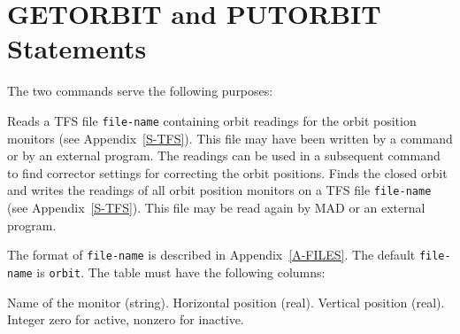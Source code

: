 \section{GETORBIT and PUTORBIT Statements}
\label{S-GETORB}
The two commands
serve the following purposes:
\begin{mylist}
Reads a TFS file {\tt file-name} containing orbit readings for the
orbit position monitors
(see Appendix~\ref{S-TFS}).
This file may have been written by a  command
or by an external program.
The readings can be used in a subsequent  command
to find corrector settings for correcting the orbit positions.
Finds the closed orbit and writes the readings of all orbit
position monitors on a TFS file {\tt file-name}
(see Appendix~\ref{S-TFS}).
This file may be read again by MAD or an external program.
\end{mylist}
The format of {\tt file-name} is described in Appendix~\ref{A-FILES}.
The default {\tt file-name} is {\tt orbit}.
The table must have the following columns:
\begin{mylist}
Name of the monitor (string).
Horizontal position (real).
Vertical position (real).
Integer zero for active, nonzero for inactive.
\end{mylist}
 
